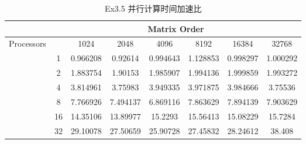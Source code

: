 \documentclass[UTF8]{article}
\begin{document}
\begin{table}[h]
    \caption{Ex3.5 并行计算时间加速比}
    \label{tab:my-table}
    \centering
    \scalebox{0.8} {
    \begin{tabular}{|c|c|c|c|c|c|c|c|}
    \hline
                                & \multicolumn{7}{c|}{Matrix Order}                                    \\ \hline
    \multirow{7}{*}{Processors} &    & 1024     & 2048     & 4096     & 8192     & 16384    & 32768    \\ \cline{2-8} 
                                & 1  & 0.966208 & 0.92614  & 0.994643 & 1.128853 & 0.998297 & 1.000292 \\ \cline{2-8} 
                                & 2  & 1.883754 & 1.90153  & 1.985907 & 1.994136 & 1.999859 & 1.993272 \\ \cline{2-8} 
                                & 4  & 3.814961 & 3.75983  & 3.949335 & 3.971875 & 3.984666 & 3.75536  \\ \cline{2-8} 
                                & 8  & 7.766926 & 7.494137 & 6.869116 & 7.863629 & 7.894139 & 7.903629 \\ \cline{2-8} 
                                & 16 & 14.35106 & 13.89977 & 15.2293  & 15.56413 & 15.08229 & 15.7284  \\ \cline{2-8} 
                                & 32 & 29.10078 & 27.50659 & 25.90728 & 27.45832 & 28.24612 & 38.408   \\ \hline
    \end{tabular}}
    \end{table}
\end{document}
